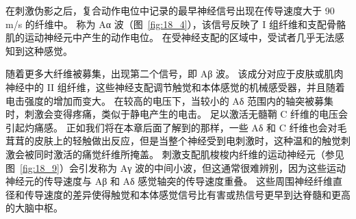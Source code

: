 在刺激伪影之后，复合动作电位中记录的最早神经信号出现在传导速度大于 90 m/s 的纤维中。
称为 Aα 波（图~\ref{fig:18_4}），该信号反映了 I 组纤维和支配骨骼肌的运动神经元中产生的动作电位。
在受神经支配的区域中，受试者几乎无法感知到这种感觉。


随着更多大纤维被募集，出现第二个信号，即 Aβ 波。
该成分对应于皮肤或肌肉神经中的 II 组纤维，这些神经支配调节触觉和本体感觉的机械感受器，并且随着电击强度的增加而变大。
在较高的电压下，当较小的 Aδ 范围内的轴突被募集时，刺激会变得疼痛，类似于静电产生的电击。
足以激活无髓鞘 C 纤维的电压会引起灼痛感。
正如我们将在本章后面了解到的那样，一些 Aδ 和 C 纤维也会对毛茸茸的皮肤上的轻触做出反应，但是当整个神经受到电刺激时，这种温和的触觉刺激会被同时激活的痛觉纤维所掩盖。
刺激支配肌梭梭内纤维的运动神经元（参见图~\ref{fig:18_9}）会引发称为 Aγ 波的中间小波，但这通常很难辨别，因为这些运动神经元的传导速度与 Aβ 和 Aδ 感觉轴突的传导速度重叠。
这些周围神经纤维直径和传导速度的差异使得触觉和本体感觉信号比有害或热信号更早到达脊髓和更高的大脑中枢。


